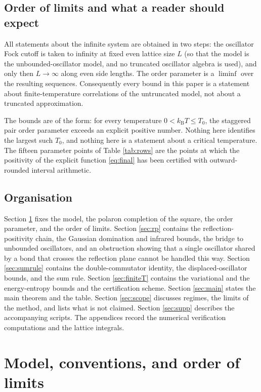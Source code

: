 \documentclass[11pt]{article}
\numberwithin{equation}{section}
\theoremstyle{definition}
\begin{document}
\subsection{Order of limits and what a reader should expect}

All statements about the infinite system are obtained in two steps: the oscillator
Fock cutoff is taken to infinity at fixed even lattice size $L$ (so that the model is
the unbounded-oscillator model, and no truncated oscillator algebra is used), and only
then $L\to\infty$ along even side lengths. The order parameter is a $\liminf$ over the
resulting sequences. Consequently every bound in this paper is a statement about
finite-temperature correlations of the untruncated model, not about a truncated
approximation.

The bounds are of the form: for every temperature $0<k_{\mathrm B}T\le T_0$, the
staggered pair order parameter exceeds an explicit positive number. Nothing here
identifies the largest such $T_0$, and nothing here is a statement about a critical
temperature. The fifteen parameter points of Table \ref{tab:rows} are the points at
which the positivity of the explicit function \eqref{eq:final} has been certified with
outward-rounded interval arithmetic.

\subsection{Organisation}

Section \ref{sec:model} fixes the model, the polaron completion of the square, the
order parameter, and the order of limits. Section \ref{sec:rp} contains the
reflection-positivity chain, the Gaussian domination and infrared bounds, the bridge to
unbounded oscillators, and an obstruction showing that a single oscillator shared by a
bond that crosses the reflection plane cannot be handled this way. Section
\ref{sec:sumrule} contains the double-commutator identity, the displaced-oscillator
bounds, and the sum rule. Section \ref{sec:finiteT} contains the variational and the
energy-entropy bounds and the certification scheme. Section \ref{sec:main} states the
main theorem and the table. Section \ref{sec:scope} discusses regimes, the limits of
the method, and lists what is not claimed. Section \ref{sec:supp} describes the
accompanying scripts. The appendices record the numerical verification computations
and the lattice integrals.

\section{Model, conventions, and order of limits}\label{sec:model}
\end{document}
